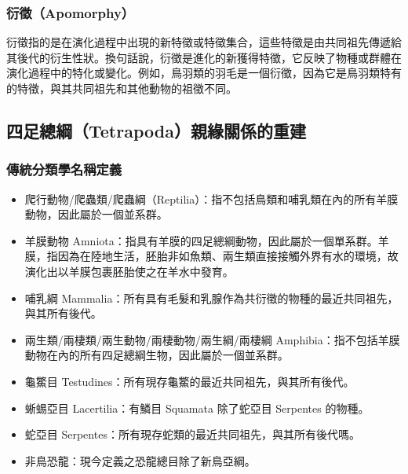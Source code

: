 \documentclass[a4paper,12pt]{report}
\begin{document}
\subsubsection{衍徵（Apomorphy）}
衍徵指的是在演化過程中出現的新特徵或特徵集合，這些特徵是由共同祖先傳遞給其後代的衍生性狀。換句話說，衍徵是進化的新獲得特徵，它反映了物種或群體在演化過程中的特化或變化。例如，鳥羽類的羽毛是一個衍徵，因為它是鳥羽類特有的特徵，與其共同祖先和其他動物的祖徵不同。
\subsection{四足總綱（Tetrapoda）親緣關係的重建}
\subsubsection{傳統分類學名稱定義}
\begin{itemize}
\item 爬行動物/爬蟲類/爬蟲綱（Reptilia）：指不包括鳥類和哺乳類在內的所有羊膜動物，因此屬於一個並系群。
\item 羊膜動物 Amniota：指具有羊膜的四足總綱動物，因此屬於一個單系群。羊膜，指因為在陸地生活，胚胎非如魚類、兩生類直接接觸外界有水的環境，故演化出以羊膜包裹胚胎使之在羊水中發育。
\item 哺乳綱 Mammalia：所有具有毛髮和乳腺作為共衍徵的物種的最近共同祖先，與其所有後代。
\item 兩生類/兩棲類/兩生動物/兩棲動物/兩生綱/兩棲綱 Amphibia：指不包括羊膜動物在內的所有四足總綱生物，因此屬於一個並系群。
\item 龜鱉目 Testudines：所有現存龜鱉的最近共同祖先，與其所有後代。
\item 蜥蜴亞目 Lacertilia：有鱗目 Squamata 除了蛇亞目 Serpentes 的物種。
\item 蛇亞目 Serpentes：所有現存蛇類的最近共同祖先，與其所有後代嗎。
\item 非鳥恐龍：現今定義之恐龍總目除了新鳥亞綱。
\end{itemize}
\end{document}
